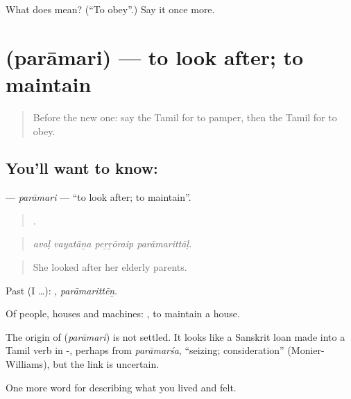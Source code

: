 \begin{tcolorbox}[breakable,colback=teal!4,colframe=teal!35!black,title={Before you move on}]
What does  mean? (\textquotedblleft{}To obey\textquotedblright{}.) Say it once more.
\end{tcolorbox}
\section[\texorpdfstring{\ta{பராமரி} (parāmari)}{பராமரி (parāmari)}]{ (parāmari) — to look after; to maintain}

\label{lesson:TA-C497-paramari}



\begin{quote}
Before the new one: say the Tamil for to pamper, then the Tamil for to obey.
\end{quote}

\subsection*{You'll want to know: }
\textbf{} — \emph{parāmari} — \textquotedblleft{}to look after; to maintain\textquotedblright{}.

\begin{quote}
   .
\end{quote}

\begin{quote}
\emph{avaḷ vayatāṉa peṟṟōraip parāmarittāḷ.}
\end{quote}

\begin{quote}
She looked after her elderly parents.
\end{quote}

Past (I …): , \emph{parāmarittēṉ}.

Of people, houses and machines:  , to maintain a house.

\begin{cousinweb}
The origin of \textbf{} (\emph{parāmari}) is not settled. It looks like a Sanskrit loan made into a Tamil verb in -, perhaps from \emph{parāmarśa}, \textquotedblleft{}seizing; consideration\textquotedblright{} (Monier-Williams), but the link is uncertain.
\end{cousinweb}

\begin{grammarlens}[title={What you've built}]
One more word for describing what you lived and felt.
\end{grammarlens}

